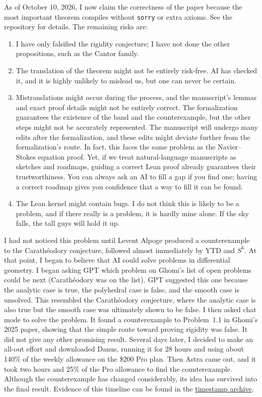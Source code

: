 \documentclass[11pt]{amsart}
\theoremstyle{definition}
\theoremstyle{remark}
\numberwithin{equation}{section}
\begin{document}
As of October 10, 2026, I now claim the correctness of the paper because
the most important theorem compiles without \texttt{sorry} or extra axioms.
See the repository for details. The remaining risks are:
\begin{enumerate}
\item I have only falsified the rigidity conjecture; I have not done the
other propositions, such as the Cantor family.
\item The translation of the theorem might not be entirely risk-free.
AI has checked it, and it is highly unlikely to mislead us, but one can
never be certain.
\item Mistranslations might occur during the process, and the manuscript's
lemmas and exact proof details might not be entirely correct. The
formalization guarantees the existence of the band and the counterexample,
but the other steps might not be accurately represented. The manuscript
will undergo many edits after the formalization, and these edits might
deviate further from the formalization's route. In fact, this faces the
same problem as the Navier--Stokes equation proof. Yet, if we treat
natural-language manuscripts as sketches and roadmaps, guiding a correct
Lean proof already guarantees their trustworthiness. You can always ask
an AI to fill a gap if you find one; having a correct roadmap gives you
confidence that a way to fill it can be found.
\item The Lean kernel might contain bugs. I do not think this is likely
to be a problem, and if there really is a problem, it is hardly mine
alone. If the sky falls, the tall guys will hold it up.
\end{enumerate}

I had not noticed this problem until Levent Alpoge produced a
counterexample to the Carath\'eodory conjecture, followed almost immediately
by YTD and $S^6$. At that point, I began to believe that AI could solve
problems in differential geometry. I began asking GPT which problem on
Ghomi's list of open problems could be next (Carath\'eodory was on the
list). GPT suggested this one because the analytic case is true, the
polyhedral case is false, and the smooth case is unsolved. This resembled
the Carath\'eodory conjecture, where the analytic case is also true but the
smooth case was ultimately shown to be false. I then asked chat mode to
solve the problem. It found a counterexample to Problem~1.1 in Ghomi's
2025 paper, showing that the simple route toward proving rigidity was
false. It did not give any other promising result. Several days later,
I decided to make an all-out effort and downloaded Danus, running it for
28 hours and using about 140\% of the weekly allowance on the \$200 Pro
plan. Then Astra came out, and it took two hours and 25\% of the Pro
allowance to find the counterexample. Although the counterexample has
changed considerably, its idea has survived into the final result.
Evidence of this timeline can be found in the
\href{https://github.com/zhangyuetong/smooth-tight-nonrigidity/blob/main/timestamp/README.md}{timestamp archive}.
\end{document}
